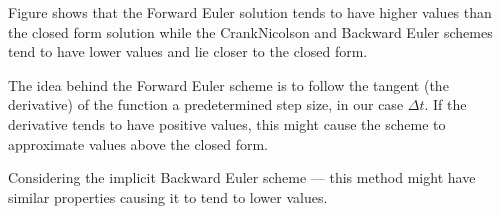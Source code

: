 Figure  shows that the Forward Euler solution
tends to have higher values than the closed form solution while the
CrankNicolson and Backward Euler schemes tend to have lower values
and lie closer to the closed form.

The idea behind the Forward Euler scheme is to follow the tangent
(the derivative) of the function a predetermined step size, in our
case $\Delta t$. If the derivative tends to have positive values,
this might cause the scheme to approximate values above the closed
form.

Considering the implicit Backward Euler scheme --- this method
might have similar properties causing it to tend to lower values.
